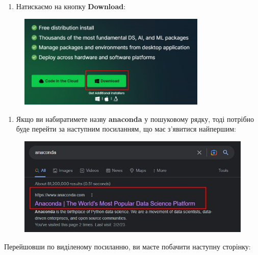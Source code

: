 \documentclass[
  letterpaper,
]{report}
\providecommand{\tightlist}{%
  \setlength{\itemsep}{0pt}\setlength{\parskip}{0pt}}\usepackage{longtable,booktabs,array}
\begin{document}
\begin{enumerate}
\def\labelenumi{\arabic{enumi}.}
\setcounter{enumi}{1}
\tightlist
\item
  Натискаємо на кнопку \textbf{Download}:
\end{enumerate}

\begin{figure}

{\centering \includegraphics[width=0.8\textwidth,height=\textheight]{Images/ap1/Screenshot_2.jpg}

}

\end{figure}

\begin{enumerate}
\def\labelenumi{\arabic{enumi}.}
\setcounter{enumi}{2}
\tightlist
\item
  Якщо ви набиратимете назву \textbf{anaconda} у пошуковому рядку, тоді
  потрібно буде перейти за наступним посиланням, що має з'явитися
  найпершим:
\end{enumerate}

\begin{figure}

{\centering \includegraphics{Images/ap1/Screenshot_3.jpg}

}

\end{figure}

Перейшовши по виділеному посиланню, ви маєте побачити наступну сторінку:
\end{document}
